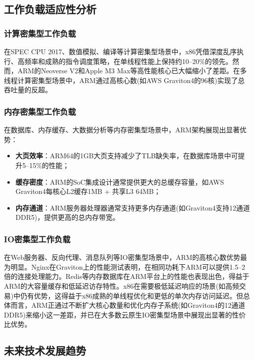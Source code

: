 \documentclass[12pt,a4paper]{IEEEtran}
\begin{document}
\subsection{工作负载适应性分析}

\subsubsection{计算密集型工作负载}

在SPEC CPU 2017、数值模拟、编译等计算密集型场景中，x86凭借深度乱序执行、高频率和成熟的指令调度策略，在单线程性能上保持约10--20\%的领先。然而，ARM的Neoverse V2和Apple M3 Max等高性能核心已大幅缩小了差距。在多线程计算密集型场景中，ARM通过高核心数(如AWS Graviton4的96核)实现了总吞吐量的反超。

\subsubsection{内存密集型工作负载}

在数据库、内存缓存、大数据分析等内存密集型场景中，ARM架构展现出显著优势：
\begin{itemize}
\item \textbf{大页效率}：ARM64的1GB大页支持减少了TLB缺失率，在数据库场景中可提升5--15\%的性能；
\item \textbf{缓存密度}：ARM的SoC集成设计通常提供更大的总缓存容量，如AWS Graviton4每核心L2缓存1MB + 共享L3 64MB；
\item \textbf{内存通道}：ARM服务器处理器通常支持更多内存通道(如Graviton4支持12通道DDR5)，提供更高的总内存带宽。
\end{itemize}

\subsubsection{IO密集型工作负载}

在Web服务器、反向代理、消息队列等IO密集型场景中，ARM的高核心数优势最为明显。Nginx在Graviton上的性能测试表明，在相同功耗下ARM可以提供1.5--2倍的连接处理能力。Redis等内存数据库在ARM平台上的性能也表现出色，得益于ARM的大容量缓存和低延迟访存特性。x86在需要极低延迟响应的场景(如高频交易)中仍有优势，这得益于x86成熟的单线程优化和更低的单次内存访问延迟。但总体而言，ARM正通过不断扩大核心数量和优化内存子系统(如Graviton4的12通道DDR5)来缩小这一差距，并已在大多数云原生IO密集型场景中展现出显著的性价比优势\cite{aws2023graviton4}。

\subsection{未来技术发展趋势}
\end{document}
